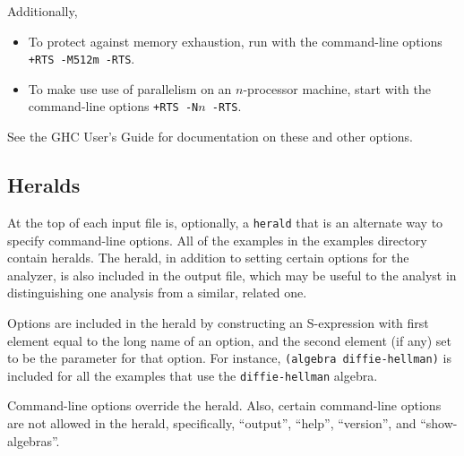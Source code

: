 Additionally,

\begin{itemize}
  \item To protect {\cpsa} against memory exhaustion, run {\cpsa} with
    the command-line options \verb|+RTS -M512m -RTS|.

  \item To make use use of parallelism on an $n$-processor machine,
    start {\cpsa} with the command-line options \verb|+RTS -N|$n$\verb| -RTS|.
\end{itemize}

See the GHC User's Guide \cite{ghcUsersGuide} for documentation on these and other options.

\subsection{Heralds}
\label{sec:heralds}
At the top of each {\cpsa} input file is, optionally, a \texttt{herald}
that is an alternate way to specify command-line options.  All of the
examples in the examples directory contain heralds.  The herald, in
addition to setting certain options for the analyzer, is also included
in the output file, which may be useful to the analyst in
distinguishing one analysis from a similar, related one.

Options are included in the herald by constructing an S-expression
with first element equal to the long name of an option, and the second
element (if any) set to be the parameter for that option.  For instance,
\texttt{(algebra diffie-hellman)} is included for all the examples that
use the \texttt{diffie-hellman} algebra.

Command-line options override the herald.  Also, certain command-line
options are not allowed in the herald, specifically, ``output'',
``help'', ``version'', and ``show-algebras''.


